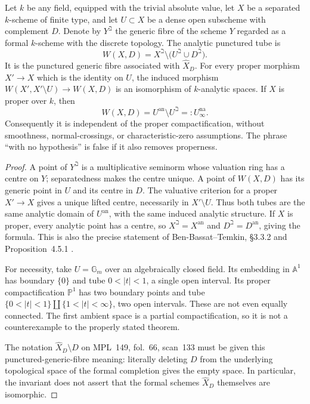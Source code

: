 Let $k$ be any field, equipped with the trivial absolute value, let $X$ be
a separated $k$-scheme of finite type, and let $U\subset X$ be a dense open
subscheme with complement $D$. Denote by $Y^{\beth}$ the generic fibre of
the scheme $Y$ regarded as a formal $k$-scheme with the discrete topology.
The analytic punctured tube is
\[
 W(X,D)=X^{\beth}\setminus\bigl(U^{\beth}\cup D^{\beth}\bigr).
\]
It is the punctured generic fibre associated with $\widehat X_D$.
For every proper morphism $X'\to X$ which is the identity on $U$, the
induced morphism $W(X',X'\setminus U)\to W(X,D)$ is an isomorphism of
$k$-analytic spaces. If $X$ is proper over $k$, then
\[
                 W(X,D)=U^{\mathrm{an}}\setminus U^{\beth}=:U_\infty^{\mathrm{na}}.
\]
Consequently it is independent of the proper compactification, without
smoothness, normal-crossings, or characteristic-zero assumptions. The
phrase ``with no hypothesis'' is false if it also removes properness.

\begin{proof}
A point of $Y^{\beth}$ is a multiplicative seminorm whose valuation ring
has a centre on $Y$; separatedness makes the centre unique. A point of
$W(X,D)$ has its generic point in $U$ and its centre in $D$. The valuative
criterion for a proper $X'\to X$ gives a unique lifted centre, necessarily
in $X'\setminus U$. Thus both tubes are the same analytic domain of
$U^{\mathrm{an}}$, with the same induced analytic structure. If $X$ is
proper, every analytic point has a centre, so $X^{\beth}=X^{\mathrm{an}}$
and $D^{\beth}=D^{\mathrm{an}}$, giving the formula. This is also the
precise statement of Ben-Bassat--Temkin, \S3.3.2 and Proposition~4.5.1
\citep{BenBassatTemkin2012}.

For necessity, take $U=\mathbb G_m$ over an algebraically closed field.
Its embedding in $\mathbb A^1$ has boundary $\{0\}$ and tube
$0<|t|<1$, a single open interval. Its proper compactification
$\mathbb P^1$ has two boundary points and tube
$\{0<|t|<1\}\amalg\{1<|t|<\infty\}$, two open intervals. These are not
even equally connected. The first ambient space is a partial
compactification, so it is not a counterexample to the properly stated
theorem.

The notation $\widehat X_D\setminus D$ on MPL~149, fol.~66, scan~133
must be given this punctured-generic-fibre meaning: literally deleting
$D$ from the underlying topological space of the formal completion gives
the empty space. In particular, the invariant does not assert that the
formal schemes $\widehat X_D$ themselves are isomorphic.
\end{proof}

